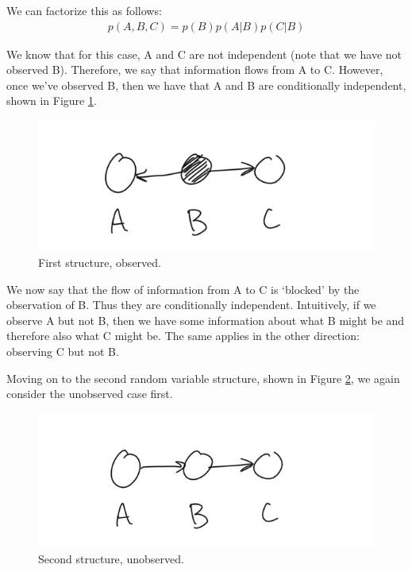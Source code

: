 We can factorize this as follows:
\begin{align*}
	p(A, B, C) = p(B) p(A | B) p(C | B)
\end{align*}

We know that for this case, A and C are not independent (note that we have not observed B). Therefore, we say that information flows from A to C. However, once we've observed B, then we have that A and B are conditionally independent, shown in Figure \ref{fig:first-case-observed}.

\begin{figure}
	\centering
	\includegraphics[width=0.5\paperwidth]{../GraphicalModels/fig/first-case-observed.png}
	\caption{First structure, observed.}
	\label{fig:first-case-observed}
\end{figure}

We now say that the flow of information from A to C is `blocked' by the observation of B. Thus they are conditionally independent. Intuitively, if we observe A but not B, then we have some information about what B might be and therefore also what C might be. The same applies in the other direction: observing C but not B.

Moving on to the second random variable structure, shown in Figure \ref{fig:second-case-unobserved}, we again consider the unobserved case first.
\begin{figure}
	\centering
	\includegraphics[width=0.5\paperwidth]{../GraphicalModels/fig/second-case-unobserved.png}
	\caption{Second structure, unobserved.}
	\label{fig:second-case-unobserved}
\end{figure}

